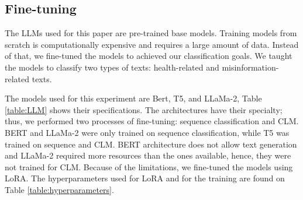 \subsection{Fine-tuning}

The LLMs used for this paper are pre-trained base models. Training models from scratch is computationally expensive and requires a large amount of data. Instead of that, we fine-tuned the models to achieved our classification goals. We taught the models to classify two types of texts: health-related and misinformation-related texts. 

The models used for this experiment are Bert, T5, and LLaMa-2, Table \ref{table:LLM} shows their specifications. The architectures have their specialty; thus, we performed two processes of fine-tuning: sequence classification and CLM. BERT and LLaMa-2 were only trained on sequence classification, while T5 was trained on sequence and CLM. BERT architecture does not allow text generation and LLaMa-2 required more resources than the ones available, hence, they were not trained for CLM. Because of the limitations, we fine-tuned the models using LoRA. The hyperparameters used for LoRA and for the training are found on Table \ref{table:hyperparameters}. 

